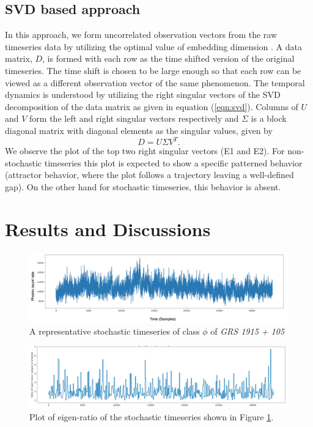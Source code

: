\documentclass[10pt,conference]{IEEEtran}
\begin{document}
\subsection{SVD based approach}
In this approach, we form uncorrelated observation vectors from the raw timeseries data by utilizing the optimal value of embedding dimension \cite{misra2006}. A data matrix, $D$, is formed with each row  as the  time shifted version of the original timeseries. The time shift is chosen to be large enough so that each row can be viewed as a different observation vector of the same phenomenon. The temporal dynamics is understood by utilizing the right singular vectors of the SVD decomposition of the data matrix as given in equation (\ref{eqn:svd}). Columns of $U$ and $V$  form the left and right singular vectors respectively and $\Sigma$ is a block diagonal matrix with diagonal elements as the singular values, given by
\begin{equation}
  D = U \Sigma V^T.
  \label{eqn:svd}
\end{equation}
   We observe the plot of the top two right singular vectors (E1 and E2). For non-stochastic timeseries this plot is expected to show a specific patterned behavior (attractor behavior, where the plot follows a trajectory leaving a well-defined gap). On the other hand for stochastic timeseries, this behavior is absent.

\section{Results and Discussions}


\begin{figure}[ht]
  \centering
  \includegraphics[width=0.9\linewidth]{phi_ts_edited.drawio.png}
  \caption{A representative stochastic timeseries of class $\phi$ of \textit{GRS 1915 + 105} }
  \label{phi_ts}
  \end{figure}

\begin{figure}[ht]
  \centering
  \includegraphics[width=0.9\linewidth]{phi_ts_eig.png}
  \caption{Plot of eigen-ratio of the stochastic timeseries shown in Figure \ref{phi_ts}.}
  \label{phi_eig}
\end{figure}
\end{document}
